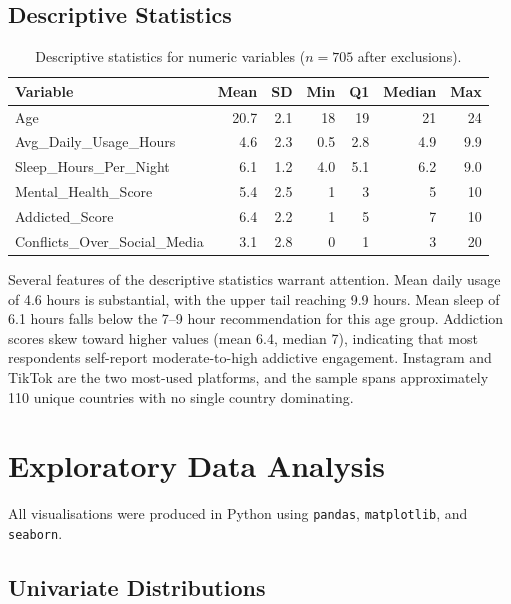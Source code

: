 \documentclass[10pt]{article}
\begin{document}
\subsection{Descriptive Statistics}

\begin{table}[H]
\centering
\caption{Descriptive statistics for numeric variables ($n = 705$ after
exclusions).}
\label{tab:desc}
\small
\begin{tabular}{@{} l r r r r r r @{}}
\toprule
\textbf{Variable} & \textbf{Mean} & \textbf{SD} & \textbf{Min} & \textbf{Q1}
  & \textbf{Median} & \textbf{Max} \\
\midrule
Age & 20.7 & 2.1 & 18 & 19 & 21 & 24 \\
Avg\_Daily\_Usage\_Hours & 4.6 & 2.3 & 0.5 & 2.8 & 4.9 & 9.9 \\
Sleep\_Hours\_Per\_Night & 6.1 & 1.2 & 4.0 & 5.1 & 6.2 & 9.0 \\
Mental\_Health\_Score & 5.4 & 2.5 & 1 & 3 & 5 & 10 \\
Addicted\_Score & 6.4 & 2.2 & 1 & 5 & 7 & 10 \\
Conflicts\_Over\_Social\_Media & 3.1 & 2.8 & 0 & 1 & 3 & 20 \\
\bottomrule
\end{tabular}
\end{table}

Several features of the descriptive statistics warrant attention. Mean daily
usage of 4.6 hours is substantial, with the upper tail reaching 9.9 hours.
Mean sleep of 6.1 hours falls below the 7--9 hour recommendation for this age
group. Addiction scores skew toward higher values (mean 6.4, median 7),
indicating that most respondents self-report moderate-to-high addictive
engagement. Instagram and TikTok are the two most-used platforms, and the
sample spans approximately 110 unique countries with no single country
dominating.

\section{Exploratory Data Analysis}

All visualisations were produced in Python using \texttt{pandas},
\texttt{matplotlib}, and \texttt{seaborn}.

\subsection{Univariate Distributions}
\end{document}
